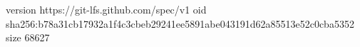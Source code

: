version https://git-lfs.github.com/spec/v1
oid sha256:b78a31cb17932a1f4c3cbeb29241ee5891abe043191d62a85513e52c0cba5352
size 68627
